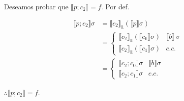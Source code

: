 \documentclass[a4paper, 12pt]{article}
\begin{document}
Deseamos probar que $\llbracket p;c_2 \rrbracket = f$. Por def. 

\begin{align*}
  \llbracket p;c_2 \rrbracket \sigma
  &= \llbracket c_2 \rrbracket_{\Bot}\left( \llbracket p \rrbracket \sigma \right) \\ 
  &= \begin{cases}
    \llbracket c_2 \rrbracket_{\Bot} \left(\llbracket c_0 \rrbracket
      \sigma\right) &
    \llbracket b \rrbracket ~ \sigma \\ 
    \llbracket c_2 \rrbracket_{\Bot} \left(\llbracket c_1 \rrbracket
      \sigma\right) & c.c.
  \end{cases} \\ 
  &= \begin{cases}
    \llbracket c_2;c_0 \rrbracket \sigma & \llbracket b \rrbracket \sigma \\ 
    \llbracket c_2;c_1 \rrbracket \sigma & c.c.
  \end{cases}
\end{align*}

$\therefore \llbracket p;c_2 \rrbracket = f$.

~
\end{document}
